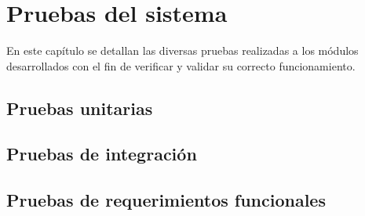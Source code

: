 \chapter{Pruebas del sistema}

En este capítulo se detallan las diversas pruebas realizadas a los módulos desarrollados con el fin de verificar y validar su correcto funcionamiento.

\section{Pruebas unitarias}

%
\section{Pruebas de integración}
\section{Pruebas de requerimientos funcionales}
